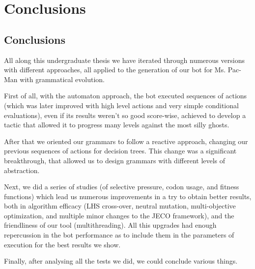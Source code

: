 \chapter{Conclusions} \label{cap:conclusions}

\section{Conclusions}
All along this undergraduate thesis we have iterated through numerous versions with different approaches, all applied to the generation of our bot for Ms. Pac-Man with grammatical evolution.
 
First of all, with the automaton approach, the bot executed sequences of actions (which was later improved with high level actions and very simple conditional evaluations), even if its results weren't so good score-wise, achieved to develop a tactic that allowed it to progress many levels against the most silly ghosts.
 
After that we oriented our grammars to follow a reactive approach, changing our previous sequences of actions for decision trees. This change was a significant breakthrough, that allowed us to design grammars with different levels of abstraction.
 
Next, we did a series of studies (of selective pressure, codon usage, and fitness functions) which lead us numerous improvements in a try to obtain better results, both in algorithm efficacy (LHS cross-over, neutral mutation, multi-objective optimization, and multiple minor changes to the JECO framework), and the friendliness of our tool (multithreading). All this upgrades had enough repercussion in the bot performance as to include them in the parameters of execution for the best results we show.
 
Finally, after analysing all the tests we did, we could conclude various things.

